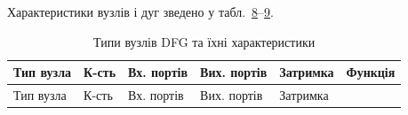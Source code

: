 Характеристики вузлів і дуг зведено у
табл.~\hyperref[tab:nodes]{8}--\hyperref[tab:edges]{9}.

\begin{longtable}[]{@{}
  >{\raggedright\arraybackslash}p{}
  >{\raggedright\arraybackslash}p{}
  >{\raggedright\arraybackslash}p{}
  >{\raggedright\arraybackslash}p{}
  >{\raggedright\arraybackslash}p{}
  >{\raggedright\arraybackslash}p{}@{}}
\caption{\protect{}\label{tab:nodes}{}Типи вузлів DFG та
їхні характеристики}\tabularnewline
\toprule\noalign{}
\begin{minipage}[b]{\linewidth}\raggedright
Тип вузла
\end{minipage} & \begin{minipage}[b]{\linewidth}\raggedright
К-сть
\end{minipage} & \begin{minipage}[b]{\linewidth}\raggedright
Вх. портів
\end{minipage} & \begin{minipage}[b]{\linewidth}\raggedright
Вих. портів
\end{minipage} & \begin{minipage}[b]{\linewidth}\raggedright
Затримка
\end{minipage} & \begin{minipage}[b]{\linewidth}\raggedright
Функція
\end{minipage} \\
\midrule\noalign{}
\endfirsthead
\toprule\noalign{}
\begin{minipage}[b]{\linewidth}\raggedright
Тип вузла
\end{minipage} & \begin{minipage}[b]{\linewidth}\raggedright
К-сть
\end{minipage} & \begin{minipage}[b]{\linewidth}\raggedright
Вх. портів
\end{minipage} & \begin{minipage}[b]{\linewidth}\raggedright
Вих. портів
\end{minipage} & \begin{minipage}[b]{\linewidth}\raggedright
Затримка
\end{minipage} & \begin{minipage}[b]{\linewidth}\raggedright

\end{minipage}
\end{longtable}

